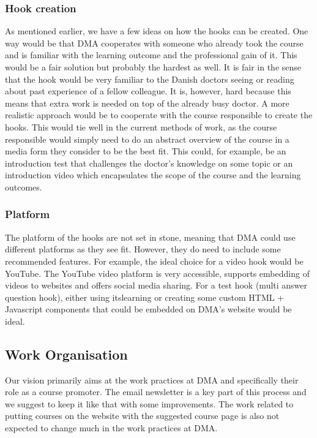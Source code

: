 \subsubsection{Hook creation}
As mentioned earlier, we have a few ideas on how the hooks can be created. One way would be that DMA cooperates with someone who already took the course and is familiar with the learning outcome and the professional gain of it. This would be a fair solution but probably the hardest as well. It is fair in the sense that the hook would be very familiar to the Danish doctors seeing or reading about past experience of a fellow colleague. It is, however, hard because this means that extra work is needed on top of the already busy doctor. A more realistic approach would be to cooperate with the course responsible to create the hooks. This would tie well in the current methods of work, as the course responsible would simply need to do an abstract overview of the course in a media form they consider to be the best fit. This could, for example, be an introduction test that challenges the doctor’s knowledge on some topic or an introduction video which encapsulates the scope of the course and the learning outcomes. 

\subsubsection{Platform}
The platform of the hooks are not set in stone, meaning that DMA could use different platforms as they see fit. However, they do need to include some recommended features. For example, the ideal choice for a video hook would be YouTube. The YouTube video platform is very accessible, supports embedding of videos to websites and offers social media sharing. For a test hook (multi answer question hook), either using itslearning or creating some custom HTML + Javascript components that could be embedded on DMA’s website would be ideal. 

\subsection{Work Organisation} 
Our vision primarily aims at the work practices at DMA and specifically their role as a course promoter. The email newsletter is a key part of this process and we suggest to keep it like that with some improvements. The work related to putting courses on the website with the suggested course page is also not expected to change much in the work practices at DMA.

